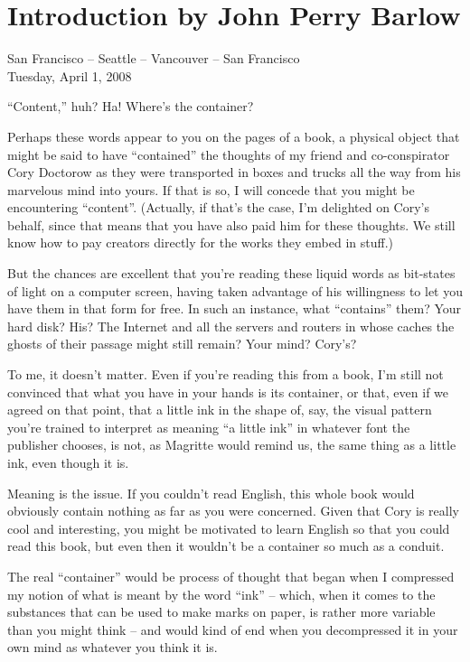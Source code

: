 \section{Introduction by John Perry Barlow}

San Francisco -- Seattle -- Vancouver -- San Francisco\\
Tuesday, April 1, 2008

``Content,'' huh? Ha! Where's the container?

Perhaps these words appear to you on the pages of a book, a
physical object that might be said to have ``contained'' the thoughts
of my friend and co-conspirator Cory Doctorow as they were
transported in boxes and trucks all the way from his marvelous mind
into yours. If that is so, I will concede that you might be
encountering ``content''. (Actually, if that's the case, I'm
delighted on Cory's behalf, since that means that you have also
paid him for these thoughts. We still know how to pay creators
directly for the works they embed in stuff.)

But the chances are excellent that you're reading these liquid
words as bit-states of light on a computer screen, having taken
advantage of his willingness to let you have them in that form for
free. In such an instance, what ``contains'' them? Your hard disk?
His? The Internet and all the servers and routers in whose caches
the ghosts of their passage might still remain? Your mind? Cory's?

To me, it doesn't matter. Even if you're reading this from a book,
I'm still not convinced that what you have in your hands is its
container, or that, even if we agreed on that point, that a little
ink in the shape of, say, the visual pattern you're trained to
interpret as meaning ``a little ink'' in whatever font the publisher
chooses, is not, as Magritte would remind us, the same thing as a
little ink, even though it is.

Meaning is the issue. If you couldn't read English, this whole book
would obviously contain nothing as far as you were concerned. Given
that Cory is really cool and interesting, you might be motivated to
learn English so that you could read this book, but even then it
wouldn't be a container so much as a conduit.

The real ``container'' would be process of thought that began when I
compressed my notion of what is meant by the word ``ink'' -- which,
when it comes to the substances that can be used to make marks on
paper, is rather more variable than you might think -- and would
kind of end when you decompressed it in your own mind as whatever
you think it is.

